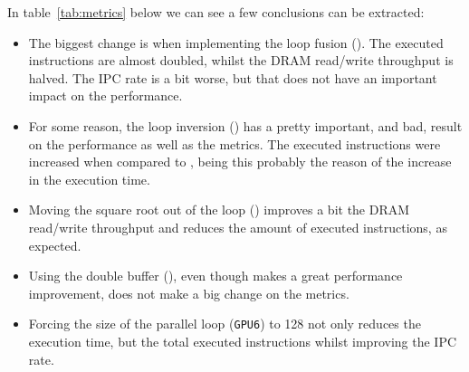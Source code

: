 In table~\ref{tab:metrics} below we can see a few conclusions can be extracted:
\begin{itemize}
	\item The biggest change is when implementing the loop fusion (). The executed instructions are almost doubled, whilst the DRAM read/write throughput is halved. The IPC rate is a bit worse, but that does not have an important impact on the performance.
	\item For some reason, the loop inversion () has a pretty important, and bad, result on the performance as well as the metrics. The executed instructions were increased when compared to , being this probably the reason of the increase in the execution time.
	\item Moving the square root out of the loop () improves a bit the DRAM read/write throughput and reduces the amount of executed instructions, as expected.
	\item Using the double buffer (), even though makes a great performance improvement, does not make a big change on the metrics.
	\item Forcing the size of the parallel loop (\texttt{GPU6}) to 128 not only reduces the execution time, but the total executed instructions whilst improving the IPC rate.
\end{itemize}

\begin{table}[H]
	\centering
	\caption{Summary of the average metrics obtained with  for the different implementations of the program for GPU}
	\label{tab:metrics}
\end{table}

